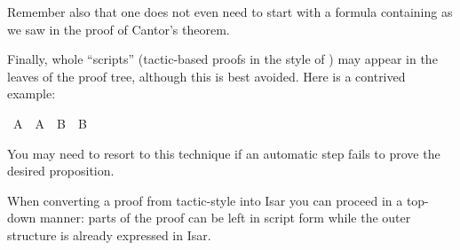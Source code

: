 \begin{isabellebody}
\begin{isamarkuptext}
Remember also that one does not even need to start with a formula
containing \isa{{\isasymexists}} as we saw in the proof of Cantor's theorem.%
\end{isamarkuptext}%
\isamarkuptrue%
%
\isamarkuptrue%
%
\begin{isamarkuptext}%
Finally, whole ``scripts'' (tactic-based proofs in the style of
\cite{LNCS2283}) may appear in the leaves of the proof tree, although this is
best avoided.  Here is a contrived example:%
\end{isamarkuptext}%
\isamarkuptrue%
\ {\isachardoublequote}A\ {\isasymlongrightarrow}\ {\isacharparenleft}A\ {\isasymlongrightarrow}\ B{\isacharparenright}\ {\isasymlongrightarrow}\ B{\isachardoublequote}\isanewline
\isamarkupfalse%
\isamarkupfalse%
\isamarkupfalse%
\isamarkupfalse%
\isamarkupfalse%
\isamarkupfalse%
\isamarkupfalse%
\isamarkupfalse%
\isamarkupfalse%
\isamarkupfalse%
%
\begin{isamarkuptext}%
\noindent You may need to resort to this technique if an
automatic step fails to prove the desired proposition.

When converting a proof from tactic-style into Isar you can proceed
in a top-down manner: parts of the proof can be left in script form
while the outer structure is already expressed in Isar.%
\end{isamarkuptext}%
\isamarkuptrue%
\isamarkupfalse%
\end{isabellebody}%
